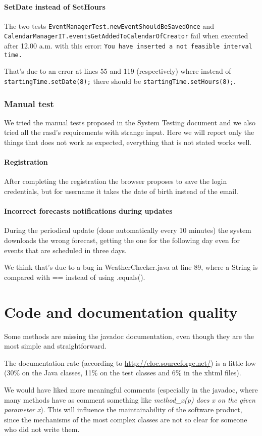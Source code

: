 \documentclass[10pt,a4paper,titlepage]{article}
\begin{document}
\subsection{SetDate instead of SetHours}
The two tests \texttt{EventManagerTest.newEventShouldBeSavedOnce} and\\ \texttt{CalendarManagerIT.eventsGetAddedToCalendarOfCreator} fail when executed after 12.00 a.m. with this error: \texttt{You have inserted a not feasible interval time.}

That's due to an error at lines 55 and 119 (respectively) where instead of \texttt{startingTime.setDate(8);} there should be \texttt{startingTime.setHours(8);}.

\section{Manual test}
We tried the manual tests proposed in the System Testing document and we also tried all the rasd's requirements with strange input. Here we will report only the things that does not work as expected, everything that is not stated works well.

\subsection{Registration}
After completing the registration the browser proposes to save the login credentials, but for username it takes the date of birth instead of the email.

\subsection{Incorrect forecasts notifications during updates}
During the periodical update (done automatically every 10 minutes) the system downloads the wrong forecast, getting the one for the following day even for events that are scheduled in three days.

We think that's due to a bug in WeatherChecker.java at line 89, where a String is compared with == instead of using .equals().

\pagebreak
\part{Code and documentation quality}
\label{part4}
Some methods are missing the javadoc documentation, even though they are the most simple and straightforward.

The documentation rate (according to \url{http://cloc.sourceforge.net/}) is a little low (30\% on the Java classes, 11\% on the test classes and 6\% in the xhtml files).

We would have liked more meaningful comments (especially in the javadoc, where many methods have as comment something like \emph{method\_x(p) does x on the given parameter x}). This will influence the maintainability of the software product, since the mechanisms of the most complex classes are not so clear for someone who did not write them.
\end{document}
